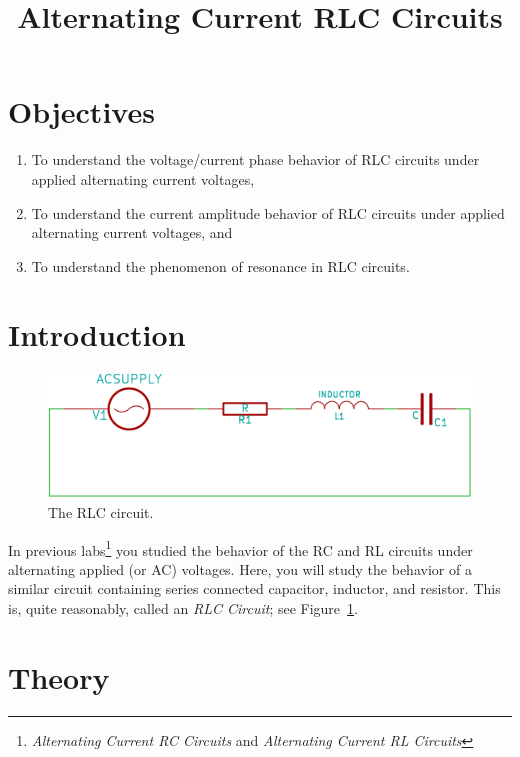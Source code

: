 \documentclass[12pt]{article}
\title{Alternating Current RLC Circuits}
\author{}
\date{}
\begin{document}
\maketitle

\section{Objectives}
\label{sec:objectives}

\begin{enumerate}
\item To understand the voltage/current phase behavior of RLC circuits
  under applied alternating current voltages,
\item To understand the current amplitude behavior of RLC circuits
  under applied alternating current voltages, and
\item To understand the phenomenon of resonance in RLC circuits.
\end{enumerate}

\section{Introduction}
\label{sec:introduction}

\begin{figure}
  \centering
  \includegraphics[width=2\textwidth/3]{figures/rlc-circuit}
  \caption{The RLC circuit.}
  \label{fig:rlccircuit}
\end{figure}
In previous labs\footnote{\textit{Alternating Current RC Circuits} and
  \textit{Alternating Current RL Circuits}} you studied the behavior
of the RC and RL circuits under alternating applied (or AC) voltages.
Here, you will study the behavior of a similar circuit containing
series connected capacitor, inductor, and resistor.  This is, quite
reasonably, called an \textit{RLC Circuit}; see
Figure~\ref{fig:rlccircuit}.

\section{Theory}
\label{sec:theory}
\end{document}
